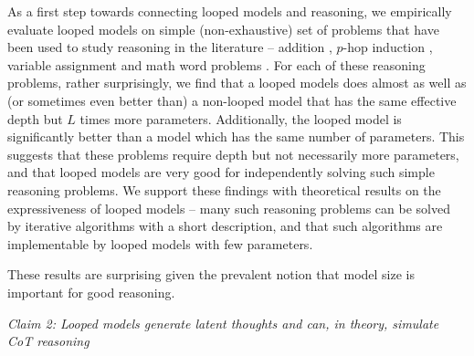 \iffalse 
As a first step towards connecting looped models and reasoning, we empirically evaluate looped models on simple (non-exhaustive) set of problems that have been used to study reasoning in the literature -- addition \citep{nye2021show,nogueira2021investigating,li2024chain}, $p$-hop induction \citep{sanford2024transformers}, variable assignment \citep{saunshi2024inductive} and math word problems \citep{wei2022chain,ye2024physics}.
For each of these reasoning problems, rather surprisingly, we find that a  looped models does almost as well as (or sometimes even better than) a non-looped model  that has the same effective depth but $L$ times more parameters. Additionally, the looped model is significantly better than a  model which has the same number of parameters.
This suggests that these problems require depth but not necessarily more parameters, and that looped models are very good for independently solving such simple reasoning problems. 
We support these findings with theoretical results on the expressiveness of looped models -- many such reasoning problems can be solved by iterative algorithms with a short description, and that such algorithms are implementable by looped models with few parameters.

These results are surprising given the prevalent notion that model size is important for good reasoning.




\vspace{-0.05in}
\begin{center}
    \textit{Claim 2: Looped models generate latent thoughts and can, in theory, simulate CoT reasoning}
\end{center}
\vspace{-0.05in}

